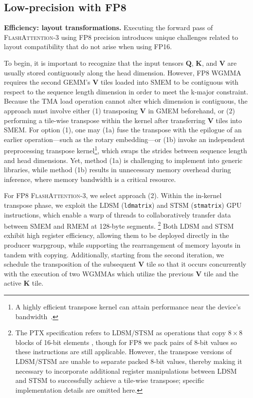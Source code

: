 \begin{algorithm}[H]
\begin{algorithmic}[1]
\subsection{Low-precision with FP8}
\label{sec:algofp8}

\textbf{Efficiency: layout transformations.} Executing the forward pass of \textsc{FlashAttention-3} using FP8 precision introduces unique challenges related to layout compatibility that do not arise when using FP16.

To begin, it is important to recognize that the input tensors $\mathbf{Q}$, $\mathbf{K}$, and $\mathbf{V}$ are usually stored contiguously along the head dimension. However, FP8 WGMMA requires the second GEMM's $\mathbf{V}$ tiles loaded into SMEM to be contiguous with respect to the sequence length dimension in order to meet the k-major constraint. Because the TMA load operation cannot alter which dimension is contiguous, the approach must involve either (1) transposing $\mathbf{V}$ in GMEM beforehand, or (2) performing a tile-wise transpose within the kernel after transferring $\mathbf{V}$ tiles into SMEM. For option (1), one may (1a) fuse the transpose with the epilogue of an earlier operation—such as the rotary embedding—or (1b) invoke an independent preprocessing transpose kernel\footnote{A highly efficient transpose kernel can attain performance near the device’s bandwidth~\citep{colfax_cutlass_transpose_2024}.}, which swaps the strides between sequence length and head dimensions. Yet, method (1a) is challenging to implement into generic libraries, while method (1b) results in unnecessary memory overhead during inference, where memory bandwidth is a critical resource.

For FP8 \textsc{FlashAttention-3}, we select approach (2). Within the in-kernel transpose phase, we exploit the LDSM (\verb|ldmatrix|) and STSM (\verb|stmatrix|) GPU instructions, which enable a warp of threads to collaboratively transfer data between SMEM and RMEM at 128-byte segments. \footnote{The PTX specification refers to LDSM/STSM as operations that copy $8 \times 8$ blocks of 16-bit elements \cite[\S 9.7.13.4.15-16]{ptx}, though for FP8 we pack pairs of 8-bit values so these instructions are still applicable. However, the transpose versions of LDSM/STSM are unable to separate packed 8-bit values, thereby making it necessary to incorporate additional register manipulations between LDSM and STSM to successfully achieve a tile-wise transpose; specific implementation details are omitted here.} Both LDSM and STSM exhibit high register efficiency, allowing them to be deployed directly in the producer warpgroup, while supporting the rearrangement of memory layouts in tandem with copying. Additionally, starting from the second iteration, we schedule the transposition of the subsequent $\mathbf{V}$ tile so that it occurs concurrently with the execution of two WGMMAs which utilize the previous $\mathbf{V}$ tile and the active $\mathbf{K}$ tile.


\end{algorithmic}
\end{algorithm}
